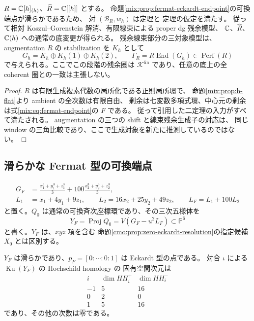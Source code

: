 \begin{corollary}[可換点の局所環上の実際の残余模型]
\label{mix:cor:h-local-window}
$R=\mathbb C[h]_{(h)}$、$\widehat R=\mathbb C[[h]]$ とする。
命題\ref{mix:prop:fermat-eckardt-endpoint}の可換端点が滑らかであるため、
対 $(\mathscr B_R,w_h)$ は定理と
定理の仮定を満たす。
従って相対 Koszul--Gorenstein 解消、有限線束による proper dg 残余模型、
$\mathbb C$、$\widehat R$、$\mathbb C(h)$ への通常の底変更が得られる。
残余線束部分の三対象模型は、augmentation $R$ の stabilization を $K_h$ として
\[
 G_h=K_h\oplus K_h(1)\oplus K_h(2),\qquad
 \Gamma_R=R\operatorname{End}(G_h)\in\operatorname{Perf}(R)
\]
で与えられる。ここでこの段階の残余圏は
$\mathcal K^{\mathrm{lin}}$ であり、任意の底上の全 coherent 圏との一致は主張しない。
\end{corollary}

\begin{proof}
$R$ は有限生成複素代数の局所化である正則局所環で、
命題\ref{mix:prop:h-flat}より ambient の全次数は有限自由、
剰余は七変数多項式環、中心元の剰余は式\eqref{mix:eq:fermat-endpoint}の $F$ である。
従って引用した二定理の入力がすべて満たされる。
augmentation の三つの shift と線束残余生成子の対応は、
同じ window の三角比較であり、ここで生成対象を新たに推測しているのではない。
\end{proof}

\subsection{滑らかな Fermat 型の可換端点}

\[
\begin{aligned}
 G_F&=\frac{x_1^3+y_1^3+z_1^3}{3}
       +100\frac{x_2^3+y_2^3+z_2^3}{3},\\
 L_1&=x_1+4y_1+9z_1,\qquad
 L_2=16x_2+25y_2+49z_2,\qquad L_F=L_1+100L_2
\end{aligned}
\]
と置く。$Q_0$ は通常の可換斉次座標環であり、その三次五様体を
\begin{equation}\label{mix:eq:fermat-endpoint}
 Y_F=\operatorname{Proj}Q_0
     =V(G_F-u^2L_F)\subset\mathbb P^6
\end{equation}
と書く。$Y_F$ は、$xyz$ 項を含む
命題\ref{cmo:prop:zero-eckardt-resolution}の指定候補 $X_0$ とは区別する。

\begin{proposition}[可換端点の滑らかさと対合指標]
\label{mix:prop:fermat-eckardt-endpoint}
$Y_F$ は滑らかであり、$p_F=[0:\cdots:0:1]$ は Eckardt 型の点である。
対合 $\iota$ による $\operatorname{Ku}(Y_F)$ の Hochschild homology の
固有空間次元は
\begin{equation}\label{mix:eq:fermat-hh-character}
 \begin{array}{c|rr}
 i&\dim HH_i^+&\dim HH_i^-\\\hline
 -1&5&16\\
 0&2&0\\
 1&5&16
 \end{array}
\end{equation}
であり、その他の次数は零である。
\end{proposition}

